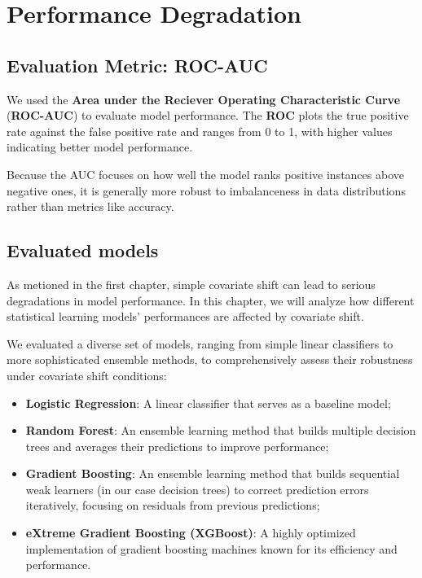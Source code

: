 \chapter{Performance Degradation}

\vspace{-0.3em}

\section{Evaluation Metric: ROC-AUC}

We used the \textbf{Area under the Reciever Operating Characteristic Curve} (\textbf{ROC-AUC}) to evaluate model performance. The \textbf{ROC} plots the true positive rate against the false positive rate and ranges from 0 to 1, with higher values indicating better model performance.

Because the AUC focuses on how well the model ranks positive instances above negative ones, it is generally more robust to imbalanceness in data distributions rather than metrics like accuracy.

\vspace{-0.3em}

\section{Evaluated models}

As metioned in the first chapter, simple covariate shift can lead to serious degradations in model performance. In this chapter, we will analyze how different statistical learning models' performances are affected by covariate shift. 

We evaluated a diverse set of models, ranging from simple linear classifiers to more sophisticated ensemble methods, to comprehensively assess their robustness under covariate shift conditions:

\begin{itemize}
    \item \textbf{Logistic Regression}: A linear classifier that serves as a baseline model;
    \item \textbf{Random Forest}: An ensemble learning method that builds multiple decision trees and averages their predictions to improve performance;
    \item \textbf{Gradient Boosting}: An ensemble learning method that builds sequential weak learners (in our case decision trees) to correct prediction errors iteratively, focusing on residuals from previous predictions;
    \item \textbf{eXtreme Gradient Boosting (XGBoost)}: A highly optimized implementation of gradient boosting machines known for its efficiency and performance.
\end{itemize}

